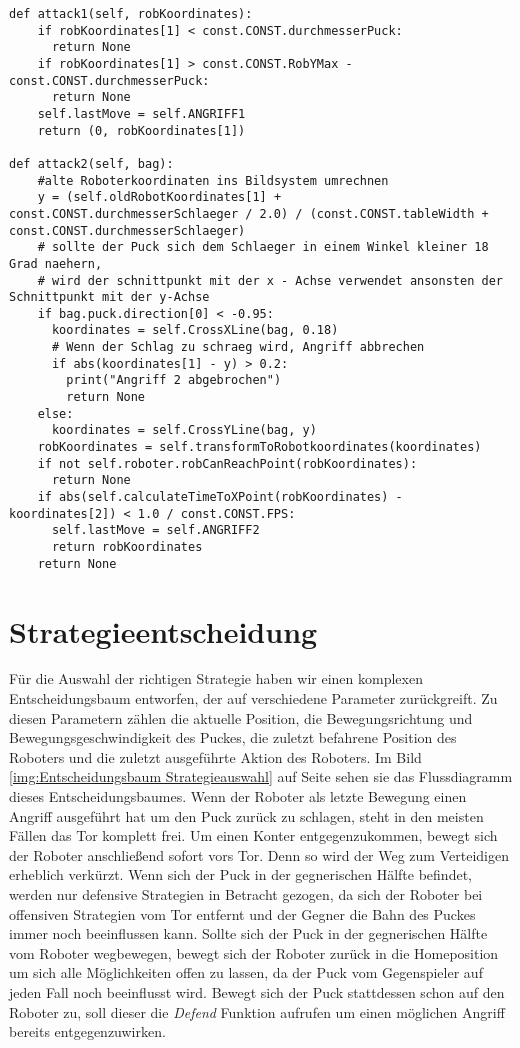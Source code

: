 \pagebreak
\begin{lstlisting}[caption= python-funktion für Offensivstrategien, label=lst:Offensivstrategien]
def attack1(self, robKoordinates):
	if robKoordinates[1] < const.CONST.durchmesserPuck:
	  return None
	if robKoordinates[1] > const.CONST.RobYMax - const.CONST.durchmesserPuck:
	  return None
	self.lastMove = self.ANGRIFF1
	return (0, robKoordinates[1])
    
def attack2(self, bag):
	#alte Roboterkoordinaten ins Bildsystem umrechnen
	y = (self.oldRobotKoordinates[1] + const.CONST.durchmesserSchlaeger / 2.0) / (const.CONST.tableWidth +  const.CONST.durchmesserSchlaeger)
	# sollte der Puck sich dem Schlaeger in einem Winkel kleiner 18 Grad naehern,
	# wird der schnittpunkt mit der x - Achse verwendet ansonsten der Schnittpunkt mit der y-Achse
	if bag.puck.direction[0] < -0.95:
	  koordinates = self.CrossXLine(bag, 0.18)
	  # Wenn der Schlag zu schraeg wird, Angriff abbrechen
	  if abs(koordinates[1] - y) > 0.2:
	    print("Angriff 2 abgebrochen")
	    return None
	else:
	  koordinates = self.CrossYLine(bag, y)	
	robKoordinates = self.transformToRobotkoordinates(koordinates)
	if not self.roboter.robCanReachPoint(robKoordinates):
	  return None
	if abs(self.calculateTimeToXPoint(robKoordinates) - koordinates[2]) < 1.0 / const.CONST.FPS:
	  self.lastMove = self.ANGRIFF2
	  return robKoordinates
	return None
\end{lstlisting}

\section{Strategieentscheidung}
\label{sec:Strategieentscheidung}
Für die Auswahl der richtigen Strategie haben wir einen komplexen Entscheidungsbaum entworfen, der auf verschiedene Parameter zurückgreift. Zu diesen Parametern zählen die aktuelle Position, die Bewegungsrichtung und Bewegungsgeschwindigkeit des Puckes, die zuletzt befahrene Position des Roboters und die zuletzt ausgeführte Aktion des Roboters. Im Bild \ref{img:Entscheidungsbaum Strategieauswahl} auf Seite \pageref{img:Entscheidungsbaum Strategieauswahl} sehen sie das Flussdiagramm dieses Entscheidungsbaumes. Wenn der Roboter als letzte Bewegung einen Angriff ausgeführt hat um den Puck zurück zu schlagen, steht in den meisten Fällen das Tor komplett frei. Um einen Konter entgegenzukommen, bewegt sich der Roboter anschließend sofort vors Tor. Denn so wird der Weg zum Verteidigen erheblich verkürzt. Wenn sich der Puck in der gegnerischen Hälfte befindet, werden nur defensive Strategien in Betracht gezogen, da sich der Roboter bei offensiven Strategien vom Tor entfernt und der Gegner die Bahn des Puckes immer noch beeinflussen kann. Sollte sich der Puck in der gegnerischen Hälfte vom Roboter wegbewegen, bewegt sich der Roboter zurück in die Homeposition um sich alle Möglichkeiten offen zu lassen, da der Puck vom Gegenspieler auf jeden Fall noch beeinflusst wird. Bewegt sich der Puck stattdessen schon auf den Roboter zu, soll dieser die \textit{Defend} Funktion aufrufen um einen möglichen Angriff bereits entgegenzuwirken.

